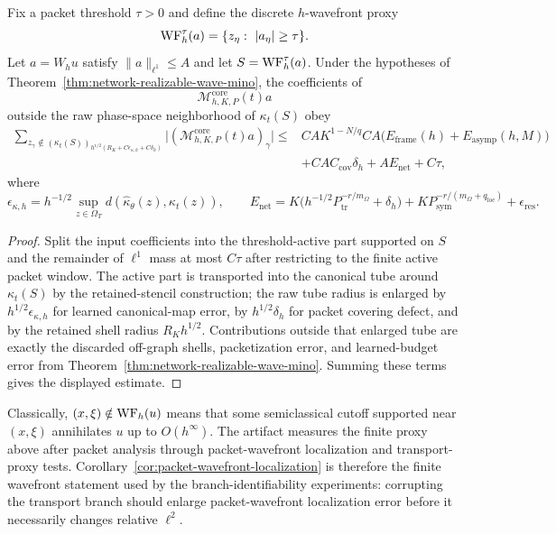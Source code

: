 \begin{corollary}
\label{cor:packet-wavefront-localization}
Fix a packet threshold $\tau>0$ and define the discrete $h$-wavefront proxy
\[
\operatorname{WF}^\tau_h(a)=\{z_\eta:\ |a_\eta|\ge \tau\}.
\]
Let $a=W_hu$ satisfy $\|a\|_{\ell^1}\le A$ and let $S=\operatorname{WF}^\tau_h(a)$.  Under the hypotheses of Theorem~\ref{thm:network-realizable-wave-mino}, the coefficients of
\[
\mathcal M_{h,K,P}^{\mathrm{core}}(t)a
\]
outside the raw phase-space neighborhood of $\kappa_t(S)$ obey
\begin{align*}
\sum_{z_\gamma\notin (\kappa_t(S))_{h^{1/2}(R_K+C\epsilon_{\kappa,h}+C\delta_h)}}
\bigl|(\mathcal M_{h,K,P}^{\mathrm{core}}(t)a)_\gamma\bigr|
\le{}&
C A K^{1-N/q}
C A\bigl(E_{\mathrm{frame}}(h)+E_{\mathrm{asymp}}(h,M)\bigr)\\
&+C A C_{\mathrm{cov}}\delta_h
+A E_{\mathrm{net}}
+C\tau ,
\end{align*}
where
\[
\epsilon_{\kappa,h}=h^{-1/2}\sup_{z\in\Omega_T}d(\widehat\kappa_\theta(z),\kappa_t(z)),
\qquad
E_{\mathrm{net}}
=
K\bigl(h^{-1/2}P_{\mathrm{tr}}^{-r/m_\Omega}+\delta_h\bigr)
+K P_{\mathrm{sym}}^{-r/(m_\Omega+q_{\mathrm{loc}})}
+\epsilon_{\mathrm{res}} .
\]
\end{corollary}

\begin{proof}
Split the input coefficients into the threshold-active part supported on $S$ and the remainder of $\ell^1$ mass at most $C\tau$ after restricting to the finite active packet window.  The active part is transported into the canonical tube around $\kappa_t(S)$ by the retained-stencil construction; the raw tube radius is enlarged by $h^{1/2}\epsilon_{\kappa,h}$ for learned canonical-map error, by $h^{1/2}\delta_h$ for packet covering defect, and by the retained shell radius $R_Kh^{1/2}$.  Contributions outside that enlarged tube are exactly the discarded off-graph shells, packetization error, and learned-budget error from Theorem~\ref{thm:network-realizable-wave-mino}.  Summing these terms gives the displayed estimate.
\end{proof}

Classically, $(x,\xi)\notin \operatorname{WF}_h(u)$ means that some semiclassical cutoff supported near $(x,\xi)$ annihilates $u$ up to $O(h^\infty)$.  The artifact measures the finite proxy above after packet analysis through packet-wavefront localization and transport-proxy tests.  Corollary~\ref{cor:packet-wavefront-localization} is therefore the finite wavefront statement used by the branch-identifiability experiments: corrupting the transport branch should enlarge packet-wavefront localization error before it necessarily changes relative $\ell^2$.

